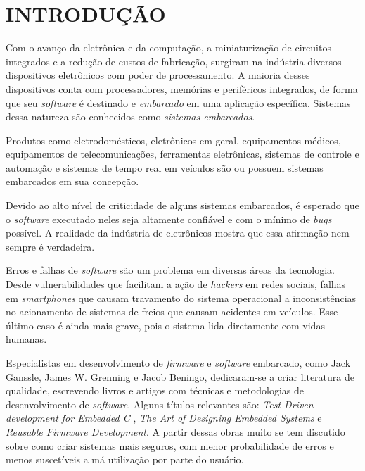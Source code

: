 \documentclass[times, twoside, watermark]{artigo}
\begin{document}

\section{INTRODUÇÃO }

Com o avanço da eletrônica e da computação, a miniaturização de circuitos integrados
e a redução de custos de fabricação, surgiram na indústria diversos dispositivos
eletrônicos com poder de processamento.
A maioria desses dispositivos conta com processadores, memórias e periféricos
integrados, de forma que seu \textit{software} é destinado e \textit{embarcado}
em uma aplicação específica. Sistemas dessa natureza são conhecidos como
\textit{sistemas embarcados}.

Produtos como eletrodomésticos, eletrônicos em geral, equipamentos médicos,
equipamentos de telecomunicações, ferramentas eletrônicas, sistemas de controle
e automação e sistemas de tempo real em veículos são ou possuem sistemas embarcados
em sua concepção.

Devido ao alto nível de criticidade de alguns sistemas embarcados, é esperado que o
\textit{software} executado neles seja altamente confiável e com o mínimo de
\textit{bugs} possível.
A realidade da indústria de eletrônicos mostra que essa afirmação nem sempre é
verdadeira.

Erros e falhas de \textit{software} são um problema em diversas áreas da tecnologia.
Desde vulnerabilidades que facilitam a ação de \textit{hackers} em redes sociais,
falhas em \textit{smartphones} que causam travamento do sistema operacional a
inconsistências no acionamento de sistemas de freios que causam acidentes em
veículos. Esse último caso é ainda mais grave, pois o sistema lida diretamente com
vidas humanas.

Especialistas em desenvolvimento de \textit{firmware} e \textit{software} embarcado,
como Jack Ganssle, James W. Grenning e Jacob Beningo, dedicaram-se a criar
literatura de qualidade, escrevendo livros e artigos com técnicas e
metodologias de desenvolvimento de \textit{software}.
Alguns títulos relevantes são: \textit{Test-Driven development for Embedded C}
\cite{tddembeddedc},
\textit{The Art of Designing Embedded Systems}\cite{ganssle2008art} e
\textit{Reusable Firmware Development}\cite{beningo2017reusable}.
A partir dessas obras muito se tem discutido sobre como criar sistemas mais seguros,
com menor probabilidade de erros e menos suscetíveis a má utilização por parte do
usuário.
\end{document}
